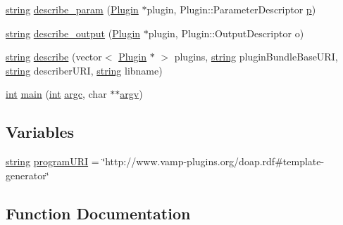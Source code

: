 \begin{DoxyCompactItemize}
\item 
\hyperlink{test__lib_f_l_a_c_2format_8c_ab02026ad0de9fb6c1b4233deb0a00c75}{string} \hyperlink{vamp-rdf-template-generator_8cpp_adf76aecc9b5a1f0943ea1283805a8017}{describe\+\_\+param} (\hyperlink{class_vamp_1_1_plugin}{Plugin} $\ast$plugin, Plugin\+::\+Parameter\+Descriptor \hyperlink{xmltok_8h_a94b60f3beb36ae85555d36dc9816769c}{p})
\item 
\hyperlink{test__lib_f_l_a_c_2format_8c_ab02026ad0de9fb6c1b4233deb0a00c75}{string} \hyperlink{vamp-rdf-template-generator_8cpp_afc871c673e7b566e72fe6901540dce2f}{describe\+\_\+output} (\hyperlink{class_vamp_1_1_plugin}{Plugin} $\ast$plugin, Plugin\+::\+Output\+Descriptor o)
\item 
\hyperlink{test__lib_f_l_a_c_2format_8c_ab02026ad0de9fb6c1b4233deb0a00c75}{string} \hyperlink{vamp-rdf-template-generator_8cpp_a01bcde0ed615408239a25743de52012c}{describe} (vector$<$ \hyperlink{class_vamp_1_1_plugin}{Plugin} $\ast$ $>$ plugins, \hyperlink{test__lib_f_l_a_c_2format_8c_ab02026ad0de9fb6c1b4233deb0a00c75}{string} plugin\+Bundle\+Base\+U\+RI, \hyperlink{test__lib_f_l_a_c_2format_8c_ab02026ad0de9fb6c1b4233deb0a00c75}{string} describer\+U\+RI, \hyperlink{test__lib_f_l_a_c_2format_8c_ab02026ad0de9fb6c1b4233deb0a00c75}{string} libname)
\item 
\hyperlink{xmltok_8h_a5a0d4a5641ce434f1d23533f2b2e6653}{int} \hyperlink{vamp-rdf-template-generator_8cpp_a3c04138a5bfe5d72780bb7e82a18e627}{main} (\hyperlink{xmltok_8h_a5a0d4a5641ce434f1d23533f2b2e6653}{int} \hyperlink{cmdline_8c_aaffeb1bf2056ea44af5b5d0ee4d6ff07}{argc}, char $\ast$$\ast$\hyperlink{cmdline_8c_ad407d5ba91709bd9b092003858600723}{argv})
\end{DoxyCompactItemize}
\subsection*{Variables}
\begin{DoxyCompactItemize}
\item 
\hyperlink{test__lib_f_l_a_c_2format_8c_ab02026ad0de9fb6c1b4233deb0a00c75}{string} \hyperlink{vamp-rdf-template-generator_8cpp_ae18b054ee657b919f1028fd8843cf383}{program\+U\+RI} = \char`\"{}http\+://www.\+vamp-\/plugins.\+org/doap.\+rdf\#template-\/generator\char`\"{}
\end{DoxyCompactItemize}


\subsection{Function Documentation}
